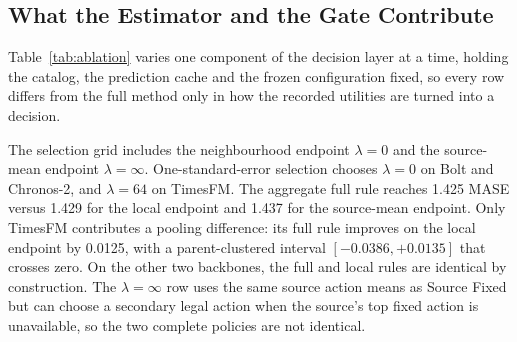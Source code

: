 \documentclass{article}
\begin{document}
\begin{table}[t]
  \caption{Retrospective TEST cross-fit of the execution threshold: each half of the parents
  supplies completed-request labels to calibrate the other half. These rows are not an
  independent prospective test. Target is clipped harmful loss, realised is the empirical
  clipped value, and repair rate is the executed share.}
  \label{tab:conformal}
  \centering
  \small
  \setlength{\tabcolsep}{5pt}
\end{table}

\subsection{What the Estimator and the Gate Contribute}
\label{sec:exp-ablation}
Table~\ref{tab:ablation} varies one component of the decision layer at a time, holding the
catalog, the prediction cache and the frozen configuration fixed, so every row differs from
the full method only in how the recorded utilities are turned into a decision.

The selection grid includes the neighbourhood endpoint $\lambda=0$ and the source-mean
endpoint $\lambda=\infty$. One-standard-error selection chooses $\lambda=0$ on Bolt and
Chronos-2, and $\lambda=64$ on TimesFM. The aggregate full rule reaches 1.425 MASE versus
1.429 for the local endpoint and 1.437 for the source-mean endpoint. Only TimesFM contributes
a pooling difference: its full rule improves on the local endpoint by 0.0125, with a
parent-clustered interval $[-0.0386,+0.0135]$ that crosses zero. On the other two backbones,
the full and local rules are identical by construction. The $\lambda=\infty$ row uses the
same source action means as Source Fixed but can choose a secondary legal action when the
source's top fixed action is unavailable, so the two complete policies are not identical.
\end{document}

